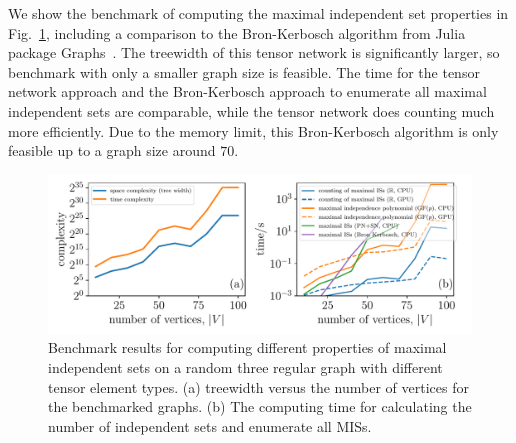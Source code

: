 \documentclass[onefignum, onetabnum]{siamart190516}
\newcommand{\<}{\langle}
\renewcommand{\>}{\rangle}
\newcommand{\Fig}[1]{Fig.~\ref{#1}}
\begin{document}
We show the benchmark of computing the maximal independent set properties in \Fig{fig:benchmark-maximal},
including a comparison to the Bron-Kerbosch algorithm from Julia package Graphs~\cite{Graphs}.
The treewidth of this tensor network is significantly larger, so benchmark with only a smaller graph size is feasible.
The time for the tensor network approach and the Bron-Kerbosch approach to enumerate all maximal independent sets are comparable,
while the tensor network does counting much more efficiently.
Due to the memory limit, this Bron-Kerbosch algorithm is only feasible up to a graph size around $70$.

\begin{figure} 
    \centering
    \includegraphics[width=\textwidth, trim={0cm 0cm 0cm 0cm}, clip]{figures/fig2.pdf}
    \caption{Benchmark results for computing different properties of maximal independent sets on a random three regular graph with different tensor element types.
    (a) treewidth versus the number of vertices for the benchmarked graphs. 
    (b) The computing time for calculating the number of independent sets and enumerate all MISs.
    }
    \label{fig:benchmark-maximal}
\end{figure}
\end{document}

